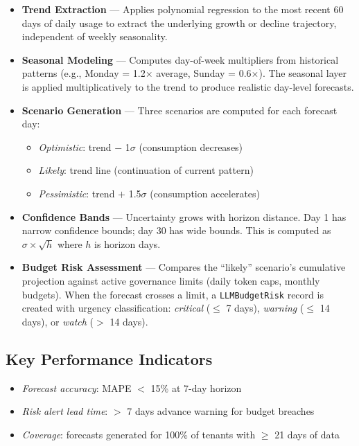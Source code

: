 \documentclass[12pt,a4paper,twoside]{report}
\newcommand{\kpi}[1]{\textit{\textcolor{accentgreen}{#1}}}
\begin{document}
\begin{itemize}
  \item \textbf{Trend Extraction} — Applies polynomial regression to the most recent 60 days of daily usage to extract the underlying growth or decline trajectory, independent of weekly seasonality.

  \item \textbf{Seasonal Modeling} — Computes day-of-week multipliers from historical patterns (e.g., Monday = 1.2$\times$ average, Sunday = 0.6$\times$). The seasonal layer is applied multiplicatively to the trend to produce realistic day-level forecasts.

  \item \textbf{Scenario Generation} — Three scenarios are computed for each forecast day:
    \begin{itemize}
      \item \textit{Optimistic}: trend $-$ 1$\sigma$ (consumption decreases)
      \item \textit{Likely}: trend line (continuation of current pattern)
      \item \textit{Pessimistic}: trend $+$ 1.5$\sigma$ (consumption accelerates)
    \end{itemize}

  \item \textbf{Confidence Bands} — Uncertainty grows with horizon distance. Day 1 has narrow confidence bounds; day 30 has wide bounds. This is computed as $\sigma \times \sqrt{h}$ where $h$ is horizon days.

  \item \textbf{Budget Risk Assessment} — Compares the ``likely'' scenario's cumulative projection against active governance limits (daily token caps, monthly budgets). When the forecast crosses a limit, a \texttt{LLMBudgetRisk} record is created with urgency classification: \textit{critical} ($\leq$ 7 days), \textit{warning} ($\leq$ 14 days), or \textit{watch} ($>$ 14 days).
\end{itemize}

\subsection{Key Performance Indicators}
\begin{itemize}
  \item \kpi{Forecast accuracy}: MAPE $<$ 15\% at 7-day horizon
  \item \kpi{Risk alert lead time}: $>$ 7 days advance warning for budget breaches
  \item \kpi{Coverage}: forecasts generated for 100\% of tenants with $\geq$ 21 days of data
\end{itemize}
\end{document}
